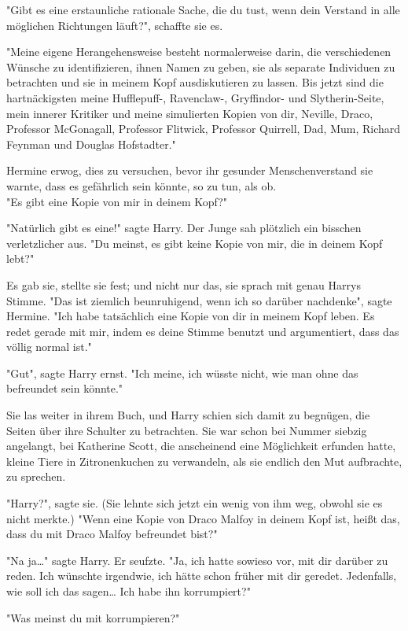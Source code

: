 {"Gibt es eine erstaunliche rationale Sache, die du tust, wenn dein Verstand in alle möglichen Richtungen läuft?", schaffte sie es.

"Meine eigene Herangehensweise besteht normalerweise darin, die verschiedenen Wünsche zu identifizieren, ihnen Namen zu geben, sie als separate Individuen zu betrachten und sie in meinem Kopf ausdiskutieren zu lassen. Bis jetzt sind die hartnäckigsten meine Hufflepuff-, Ravenclaw-, Gryffindor- und Slytherin-Seite, mein innerer Kritiker und meine simulierten Kopien von dir, Neville, Draco, Professor McGonagall, Professor Flitwick, Professor Quirrell, Dad, Mum, Richard Feynman und Douglas Hofstadter."

Hermine erwog, dies zu versuchen, bevor ihr gesunder Menschenverstand sie warnte, dass es gefährlich sein könnte, so zu tun, als ob.\\ "Es gibt eine Kopie von mir in deinem Kopf?"

"Natürlich gibt es eine!" sagte Harry. Der Junge sah plötzlich ein bisschen verletzlicher aus. "Du meinst, es gibt keine Kopie von mir, die in deinem Kopf lebt?"

Es gab sie, stellte sie fest; und nicht nur das, sie sprach mit genau Harrys Stimme. "Das ist ziemlich beunruhigend, wenn ich so darüber nachdenke", sagte Hermine. "Ich habe tatsächlich eine Kopie von dir in meinem Kopf leben. Es redet gerade mit mir, indem es deine Stimme benutzt und argumentiert, dass das völlig normal ist."

"Gut", sagte Harry ernst. "Ich meine, ich wüsste nicht, wie man ohne das befreundet sein könnte."

Sie las weiter in ihrem Buch, und Harry schien sich damit zu begnügen, die Seiten über ihre Schulter zu betrachten. Sie war schon bei Nummer siebzig angelangt, bei Katherine Scott, die anscheinend eine Möglichkeit erfunden hatte, kleine Tiere in Zitronenkuchen zu verwandeln, als sie endlich den Mut aufbrachte, zu sprechen.

"Harry?", sagte sie. (Sie lehnte sich jetzt ein wenig von ihm weg, obwohl sie es nicht merkte.) "Wenn eine Kopie von Draco Malfoy in deinem Kopf ist, heißt das, dass du mit Draco Malfoy befreundet bist?"

"Na ja…" sagte Harry. Er seufzte. "Ja, ich hatte sowieso vor, mit dir darüber zu reden. Ich wünschte irgendwie, ich hätte schon früher mit dir geredet. Jedenfalls, wie soll ich das sagen… Ich habe ihn korrumpiert?"

"Was meinst du mit korrumpieren?"

}
